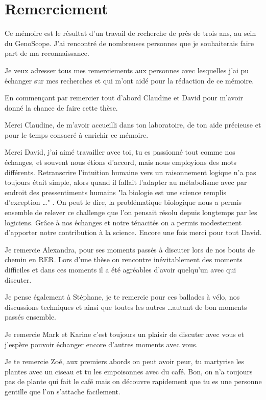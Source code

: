 \chapter*{Remerciement}
    \vspace{-4cm}
    \handwritingFont
    Ce mémoire est le résultat d’un travail de recherche de près de trois ans, au sein du GenoScope. J'ai rencontré de nombreuses personnes que je souhaiterais faire part de ma reconnaissance.
    
    Je veux adresser tous mes remerciements aux personnes avec lesquelles j’ai pu échanger sur mes recherches et qui m’ont aidé pour la rédaction de ce mémoire.
    
    En commençant par remercier tout d’abord Claudine et David pour m'avoir donné la chance de faire cette thèse.
    
    Merci Claudine, de m'avoir accueilli dans ton laboratoire, de ton aide précieuse et pour le temps consacré à enrichir ce mémoire.
    
    Merci David, j'ai aimé travailler avec toi, tu es passionné tout comme nos échanges, et souvent nous étions d'accord, mais nous employions des mots différents. Retranscrire l'intuition humaine vers un raisonnement logique n'a pas toujours était simple, alors quand il fallait l'adapter au métabolisme avec par endroit des pressentiments humains "la biologie est une science remplis d'exception \ldots" . On peut le dire, la problématique biologique nous a permis ensemble de relever ce challenge que l'on pensait résolu depuis longtemps par les logiciens. Grâce à nos échanges et notre ténacités on a permis modestement d'apporter notre contribution à la science.
    Encore une fois merci pour tout David.
    
    Je remercie Alexandra, pour ses moments passés à discuter lors de nos bouts de chemin en RER. Lors d'une thèse on rencontre inévitablement des moments difficiles et dans ces moments il a été agréables d'avoir quelqu'un avec qui discuter.
    
    Je pense également à Stéphane, je te remercie pour ces ballades à vélo, nos discussions techniques et ainsi que toutes les autres \ldots autant de bon moments passés ensemble.
    
    Je remercie Mark et Karine c'est toujours un plaisir de discuter avec vous et j'espère pouvoir échanger encore d'autres moments avec vous.
    
    Je te remercie Zoé, aux premiers abords on peut avoir peur, tu martyrise les plantes avec un ciseau et tu les empoisonnes avec du café. Bon, on n'a toujours pas de plante qui fait le café mais on découvre rapidement que tu es une personne gentille que l'on s'attache facilement.
    
